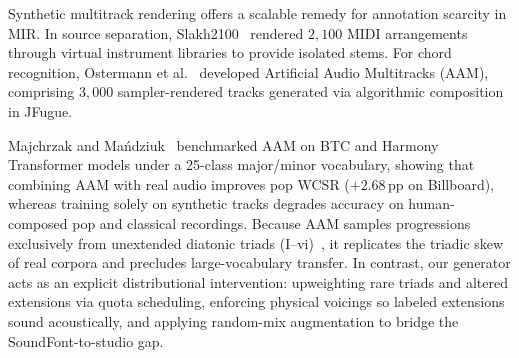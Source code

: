 Synthetic multitrack rendering offers a scalable remedy for annotation scarcity in MIR. In source separation, Slakh2100~\cite{manilow2019cutting} rendered $2{,}100$ MIDI arrangements through virtual instrument libraries to provide isolated stems. For chord recognition, Ostermann et al.~\cite{ostermann2023aam} developed Artificial Audio Multitracks (AAM), comprising $3{,}000$ sampler-rendered tracks generated via algorithmic composition in JFugue.

Majchrzak and Ma{\'n}dziuk~\cite{majchrzak2026training} benchmarked AAM on BTC and Harmony Transformer models under a 25-class major/minor vocabulary, showing that combining AAM with real audio improves pop WCSR ($+2.68\,\text{pp}$ on Billboard), whereas training solely on synthetic tracks degrades accuracy on human-composed pop and classical recordings. Because AAM samples progressions exclusively from unextended diatonic triads ($\text{I}$--$\text{vi}$)~\cite{ostermann2023aam}, it replicates the triadic skew of real corpora and precludes large-vocabulary transfer. In contrast, our generator acts as an explicit distributional intervention: upweighting rare triads and altered extensions via quota scheduling, enforcing physical voicings so labeled extensions sound acoustically, and applying random-mix augmentation to bridge the SoundFont-to-studio gap.
